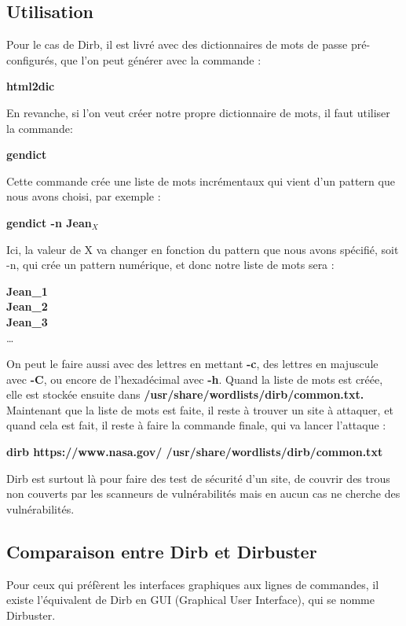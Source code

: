 \subsection{Utilisation}
Pour le cas de Dirb, il est livré avec des dictionnaires de mots de passe pré-configurés, que l’on peut générer avec la commande : 
\begin{center}
    \textbf{html2dic}
\end{center}
En revanche, si l’on veut créer notre propre dictionnaire de mots, il faut utiliser la commande:
\begin{center}
    \textbf{gendict}
\end{center}
Cette commande crée une liste de mots incrémentaux qui vient d’un pattern que nous avons choisi, par exemple : 
\begin{center}
    \textbf{gendict -n Jean$_X$}
\end{center}
Ici, la valeur de X va changer en fonction du pattern que nous avons spécifié, soit -n, qui crée un pattern numérique, et donc notre liste de mots sera :
\begin{center}
    \textbf{Jean_1}\\
    \textbf{Jean_2}\\
    \textbf{Jean_3}\\
    \dots
\end{center}
On peut le faire aussi avec des lettres en mettant \textbf{-c}, des lettres en majuscule avec \textbf{-C}, ou encore de l'hexadécimal avec \textbf{-h}.
Quand la liste de mots est créée, elle est stockée ensuite dans
\textbf{/usr/share/wordlists/dirb/common.txt.}\\
\noindent Maintenant que la liste de mots est faite, il reste à trouver un site à attaquer, et quand cela est fait, il reste à faire la commande finale, qui va lancer l’attaque :\\
\begin{center}
\textbf{dirb https://www.nasa.gov/ /usr/share/wordlists/dirb/common.txt}
\end{center}
Dirb est surtout là pour faire des test de sécurité d’un site, de couvrir des trous non couverts par les scanneurs de vulnérabilités mais en aucun cas ne cherche des vulnérabilités.\\

\subsection{Comparaison entre Dirb et Dirbuster}
Pour ceux qui préfèrent les interfaces graphiques aux lignes de commandes, il existe l'équivalent de Dirb en GUI (Graphical User Interface), qui se nomme Dirbuster.\\

